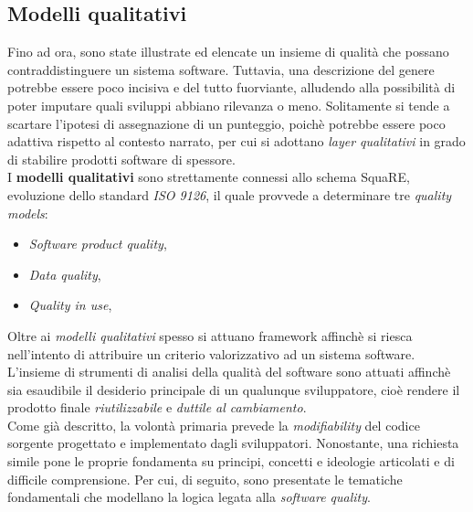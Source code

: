 \documentclass{article}
\begin{document}
\subsection*{Modelli qualitativi}
\large
Fino ad ora, sono state illustrate ed elencate un insieme di qualità che possano contraddistinguere un sistema software. Tuttavia, una descrizione del genere potrebbe essere poco incisiva e del tutto fuorviante, alludendo alla possibilità di poter imputare quali sviluppi abbiano rilevanza o meno. Solitamente si tende a scartare l'ipotesi di assegnazione di un punteggio, poichè potrebbe essere poco adattiva rispetto al contesto narrato, per cui si adottano \textit{layer qualitativi} in grado di stabilire prodotti software di spessore.\vspace*{14pt}\\
I \textbf{modelli qualitativi} sono strettamente connessi allo schema SquaRE, evoluzione dello standard \textit{ISO 9126}, il quale provvede a determinare tre \textit{quality models}:
\begin{itemize}[label={-}]
    \itemsep0em
    \item \textit{Software product quality}, 
    \item \textit{Data quality},
    \item \textit{Quality in use},
\end{itemize} 
Oltre ai \textit{modelli qualitativi} spesso si attuano framework affinchè si riesca nell'intento di attribuire un criterio valorizzativo ad un sistema software. L'insieme di strumenti di analisi della qualità del software sono attuati affinchè sia esaudibile il desiderio principale di un qualunque sviluppatore, cioè rendere il prodotto finale \textit{riutilizzabile} e \textit{duttile al cambiamento}.\vspace*{14pt}\\
Come già descritto, la volontà primaria prevede la \textit{modifiability} del codice sorgente progettato e implementato dagli sviluppatori. Nonostante, una richiesta simile pone le proprie fondamenta su principi, concetti e ideologie articolati e di difficile comprensione. Per cui, di seguito, sono presentate le tematiche fondamentali che modellano la logica legata alla \textit{software quality}.
\end{document}
